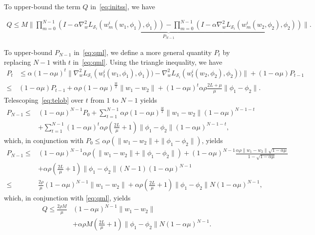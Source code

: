 \documentclass{osudissert96}
\begin{document}
To upper-bound the term $Q$ in~\cref{eq:initss}, we have
\begin{small}
\begin{align}\label{eq:qml}
Q\leq M\underbrace{\bigg\|\prod_{m=0}^{N-1}(I - \alpha \nabla_w^2L_{\mathcal{S}_i}(w_{m}^i(w_1,\phi_1),\phi_1)) -\prod_{m=0}^{N-1}(I - \alpha \nabla_w^2L_{\mathcal{S}_i}(w_{m}^i(w_2,\phi_2),\phi_2))  \bigg\|}_{P_{N-1}}.
\end{align}
\end{small}
\hspace{-0.12cm}To upper-bound $P_{N-1}$ in~\cref{eq:qml}, we define a more general quantity $P_t$ by replacing $N-1$ with $t$ in~\cref{eq:qml}. Using the triangle inequality, we have
\begin{align}\label{eq:telob}
P_t &\leq \alpha(1-\alpha\mu)^{t}\| \nabla_w^2L_{\mathcal{S}_i}(w_{t}^i(w_1,\phi_1),\phi_1)) -\nabla_w^2L_{\mathcal{S}_i}(w_{t}^i(w_2,\phi_2),\phi_2)) \| + (1-\alpha\mu) P_{t-1} \nonumber
\\\leq& (1-\alpha\mu) P_{t-1} + \alpha \rho(1-\alpha\mu)^{\frac{3t}{2}}  \|w_1-w_2\| +(1-\alpha\mu)^t\alpha\rho\frac{2L+\mu}{\mu}\|\phi_1-\phi_2\|.
\end{align}
Telescoping~\cref{eq:telob} over $t$ from $1$ to $N-1$ yields
\begin{align*}
P_{N-1}\leq &(1-\alpha\mu)^{N-1} P_0 + \sum_{t=1}^{N-1}  \alpha \rho(1-\alpha\mu)^{\frac{3t}{2}}  \|w_1-w_2\|(1-\alpha \mu)^{N-1-t} \nonumber
\\&+\sum_{t=1}^{N-1}(1-\alpha\mu)^t\alpha\rho\left(\frac{2L}{\mu}+1\right)\|\phi_1-\phi_2\|(1-\alpha \mu)^{N-1-t}, 
\end{align*}
which, in conjunction with $P_0\leq \alpha\rho(\|w_1-w_2\|+\|\phi_1-\phi_2\|)$, yields
\begin{align*}
P_{N-1}\leq& (1-\alpha\mu)^{N-1} \alpha\rho(\|w_1-w_2\|+\|\phi_1-\phi_2\|) +(1-\alpha\mu)^{N-1}\frac{ \alpha \rho \|w_1-w_2\| \sqrt{1-\alpha\mu}}{1-\sqrt{1-\alpha\mu}} \nonumber
\\&+ \alpha\rho\left(\frac{2L}{\mu}+1\right)\|\phi_1-\phi_2\|(N-1)(1-\alpha\mu)^{N-1} \nonumber
\\\leq& \frac{2\rho}{\mu}(1-\alpha\mu)^{N-1}\|w_1-w_2\|+  \alpha\rho\left(\frac{2L}{\mu}+1\right)\|\phi_1-\phi_2\|N(1-\alpha\mu)^{N-1}, 
\end{align*}
which, in conjunction with \cref{eq:qml}, yields 
\begin{align}\label{eq:qss}
Q\leq  \frac{2\rho M}{\mu}&(1-\alpha\mu)^{N-1}\|w_1-w_2\| \nonumber
\\&+  \alpha\rho M\left(\frac{2L}{\mu}+1\right)\|\phi_1-\phi_2\|N(1-\alpha\mu)^{N-1}.
\end{align}
\end{document}
